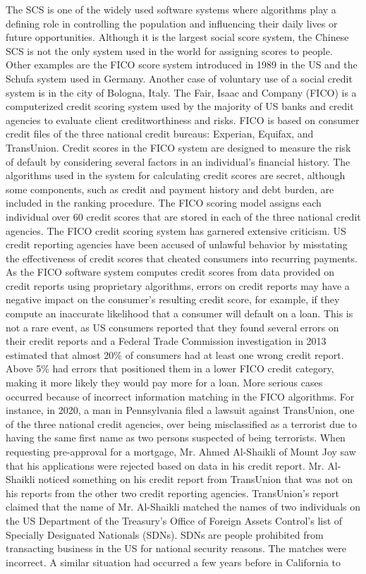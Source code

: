 The SCS is one of the widely used software systems where algorithms play a defining role in controlling the population and influencing their daily lives or future opportunities. Although it is the largest social score system, the Chinese SCS is not the only system used in the world for assigning scores to people. Other examples are the FICO score system introduced in 1989 in the US and the Schufa system used in Germany. Another case of voluntary use of a social credit system is in the city of Bologna, Italy. The Fair, Isaac and Company (FICO) is a computerized credit scoring system used by the majority of US banks and credit agencies to evaluate client creditworthiness and risks. FICO is based on consumer credit files of the three national credit bureaus: Experian, Equifax, and TransUnion. Credit scores in the FICO system are designed to measure the risk of default by considering several factors in an individual's financial history. The algorithms used in the system for calculating credit scores are secret, although some components, such as credit and payment history and debt burden, are included in the ranking procedure. The FICO scoring model assigns each individual over 60 credit scores that are stored in each of the three national credit agencies. The FICO credit scoring system has garnered extensive criticism. US credit reporting agencies have been accused of unlawful behavior by misstating the effectiveness of credit scores that cheated consumers into recurring payments. As the FICO software system computes credit scores from data provided on credit reports using proprietary algorithms, errors on credit reports may have a negative impact on the consumer's resulting credit score, for example, if they compute an inaccurate likelihood that a consumer will default on a loan. This is not a rare event, as US consumers reported that they found several errors on their credit reports and a Federal Trade Commission investigation in 2013 estimated that almost 20\% of consumers had at least one wrong credit report. Above 5\% had errors that positioned them in a lower FICO credit category, making it more likely they would pay more for a loan. More serious cases occurred because of incorrect information matching in the FICO algorithms. For instance, in 2020, a man in Pennsylvania filed a lawsuit against TransUnion, one of the three national credit agencies, over being misclassified as a terrorist due to having the same first name as two persons suspected of being terrorists. When requesting pre-approval for a mortgage, Mr. Ahmed Al-Shaikli of Mount Joy\vadjust{\vspace*{10pt}\pagebreak} saw that his \hbox{applications} were rejected based on data in his credit report. Mr. Al-Shaikli noticed something on his credit report from TransUnion that was not on his reports from the other two credit reporting agencies. TransUnion's report claimed that the name of Mr. Al-Shaikli matched the names of two individuals on the US Department of the Treasury's Office of Foreign Assets Control's list of Specially Designated Nationals (SDNs). SDNs are people prohibited from transacting business in the US for national \hbox{security} reasons. The matches were incorrect. A similar situation had occurred a few years before in California to 